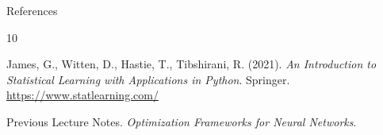 \documentclass[aspectratio=169]{beamer}
\newcommand{\1}{\mathbf{1}}
\begin{document}


\begin{frame}{References}
    \begin{thebibliography}{10}
        
        James, G., Witten, D., Hastie, T., Tibshirani, R. (2021).
        \newblock \textit{An Introduction to Statistical Learning with Applications in Python}.
        \newblock Springer.
        \newblock \url{https://www.statlearning.com/}
        
        Previous Lecture Notes.
        \newblock \textit{Optimization Frameworks for Neural Networks}.
        
    \end{thebibliography}
\end{frame}
\end{document}
